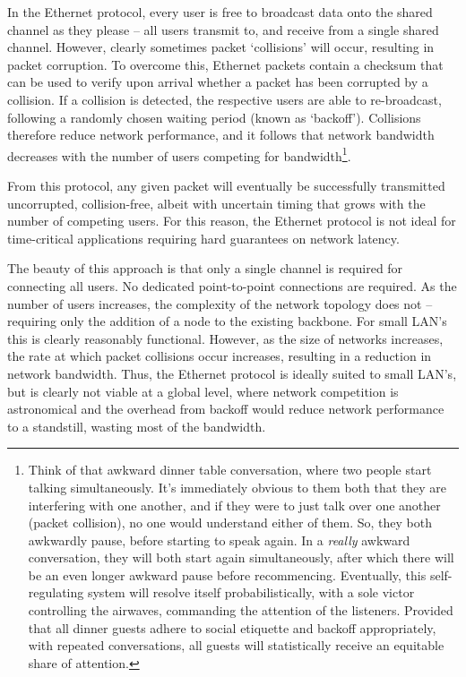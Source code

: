 \documentclass[aps,rmp,twocolumn,amsmath,amssymb,nofootinbib,superscriptaddress,longbibliography,floatfix]{revtex4-1}
\begin{document}
In the Ethernet protocol, every user is free to broadcast data onto the shared channel as they please -- all users transmit to, and receive from a single shared channel. However, clearly sometimes packet `collisions' will occur, resulting in packet corruption. To overcome this, Ethernet packets contain a checksum that can be used to verify upon arrival whether a packet has been corrupted by a collision. If a collision is detected, the respective users are able to re-broadcast, following a randomly chosen waiting period (known as `backoff'). Collisions therefore reduce network performance, and it follows that network bandwidth decreases with the number of users competing for bandwidth\footnote{Think of that awkward dinner table conversation, where two people start talking simultaneously. It's immediately obvious to them both that they are interfering with one another, and if they were to just talk over one another (packet collision), no one would understand either of them. So, they both awkwardly pause, before starting to speak again. In a \emph{really} awkward conversation, they will both start again simultaneously, after which there will be an even longer awkward pause before recommencing. Eventually, this self-regulating system will resolve itself probabilistically, with a sole victor controlling the airwaves, commanding the attention of the listeners. Provided that all dinner guests adhere to social etiquette and backoff appropriately, with repeated conversations, all guests will statistically receive an equitable share of attention.}.

From this protocol, any given packet will eventually be successfully transmitted uncorrupted, collision-free, albeit with uncertain timing that grows with the number of competing users. For this reason, the Ethernet protocol is not ideal for time-critical applications requiring hard guarantees on network latency.

The beauty of this approach is that only a single channel is required for connecting all users. No dedicated point-to-point connections are required. As the number of users increases, the complexity of the network topology does not -- requiring only the addition of a node to the existing backbone. For small LAN's this is clearly reasonably functional. However, as the size of networks increases, the rate at which packet collisions occur increases, resulting in a reduction in network bandwidth. Thus, the Ethernet protocol is ideally suited to small LAN's, but is clearly not viable at a global level, where network competition is astronomical and the overhead from backoff would reduce network performance to a standstill, wasting most of the bandwidth.
\end{document}

